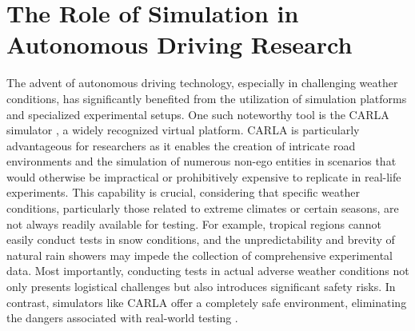 \documentclass[report.tex]{subfiles}
\begin{document}
    \section{The Role of Simulation in Autonomous Driving Research}



    The advent of autonomous driving technology, especially in challenging weather conditions, has significantly benefited from the utilization of simulation platforms and specialized experimental setups. One such noteworthy tool is the CARLA simulator \cite{dosovitskiy2017carla}, a widely recognized virtual platform. CARLA is particularly advantageous for researchers as it enables the creation of intricate road environments and the simulation of numerous non-ego entities in scenarios that would otherwise be impractical or prohibitively expensive to replicate in real-life experiments. This capability is crucial, considering that specific weather conditions, particularly those related to extreme climates or certain seasons, are not always readily available for testing. For example, tropical regions cannot easily conduct tests in snow conditions, and the unpredictability and brevity of natural rain showers may impede the collection of comprehensive experimental data. Most importantly, conducting tests in actual adverse weather conditions not only presents logistical challenges but also introduces significant safety risks. In contrast, simulators like CARLA offer a completely safe environment, eliminating the dangers associated with real-world testing \cite{Zhang2021Dec}.
\end{document}

